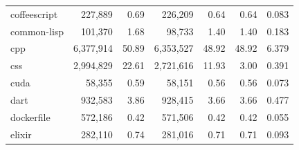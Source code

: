 \documentclass[10pt]{article} %
\begin{document}
\begin{table}[t]
{\begin{tabular}{@{\extracolsep{3pt}}lrrrrrr@{}}
coffeescript             & 227,889                                   & 0.69                                   & 226,209                                                & 0.64                                                & 0.64                       & 0.083                          \\
common-lisp              & 101,370                                   & 1.68                                   & 98,733                                                 & 1.40                                                & 1.40                       & 0.183                          \\
cpp                      & 6,377,914                                 & 50.89                                  & 6,353,527                                              & 48.92                                               & 48.92                      & 6.379                          \\
css                      & 2,994,829                                 & 22.61                                  & 2,721,616                                              & 11.93                                               & 3.00                       & 0.391                          \\
cuda                     & 58,355                                    & 0.59                                   & 58,151                                                 & 0.56                                                & 0.56                       & 0.073                          \\
dart                     & 932,583                                   & 3.86                                   & 928,415                                                & 3.66                                                & 3.66                       & 0.477                          \\
dockerfile               & 572,186                                   & 0.42                                   & 571,506                                                & 0.42                                                & 0.42                       & 0.055                          \\
elixir                   & 282,110                                   & 0.74                                   & 281,016                                                & 0.71                                                & 0.71                       & 0.093                          \\

\end{tabular}}
\end{table}
\end{document}
